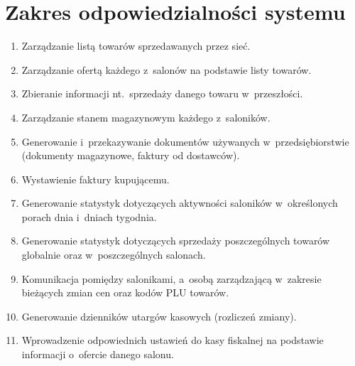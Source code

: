 \section{Zakres odpowiedzialności systemu}
\begin{enumerate}
\item Zarządzanie listą towarów sprzedawanych przez sieć.
\item Zarządzanie ofertą każdego z~salonów na podstawie listy towarów.
\item Zbieranie informacji nt.\ sprzedaży danego towaru w~przeszłości.
\item Zarządzanie stanem magazynowym każdego z~saloników.
\item Generowanie i~przekazywanie dokumentów używanych w~przedsiębiorstwie (dokumenty magazynowe, faktury od dostawców).
\item Wystawienie faktury kupującemu.
\item Generowanie statystyk dotyczących aktywności saloników w~określonych porach dnia i~dniach tygodnia.
\item Generowanie statystyk dotyczących sprzedaży poszczególnych towarów globalnie oraz w~poszczególnych salonach.
\item Komunikacja pomiędzy salonikami, a~osobą zarządzającą w~zakresie bieżących zmian cen oraz kodów PLU towarów.
\item Generowanie dzienników utargów kasowych (rozliczeń zmiany).
\item Wprowadzenie odpowiednich ustawień do kasy fiskalnej na podstawie informacji o~ofercie danego salonu.
\end{enumerate}

